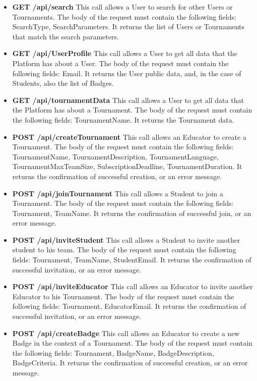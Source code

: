 \begin{itemize}
    \item \textbf{GET /api/search} This call allows a User to search for other Users or Tournaments. The body of the request must contain the following fields: SearchType, SearchParameters. It returns the list of Users or Tournaments that match the search parameters.
    \item \textbf{GET /api/UserProfile} This call allows a User to get all data that the Platform has about a User. The body of the request must contain the following fields: Email. It returns the User public data, and, in the case of Students, also the list of Badges.
    \item \textbf{GET /api/tournamentData} This call allows a User to get all data that the Platform has about a Tournament. The body of the request must contain the following fields: TournamentName. It returns the Tournament data.
    \item \textbf{POST /api/createTournament} This call allows an Educator to create a Tournament. The body of the request must contain the following fields: TournamentName, TournamentDescription, TournamentLanguage, TournamentMaxTeamSize, SubscriptionDeadline, TournamentDuration. It returns the confirmation of successful creation, or an error message.
    \item \textbf{POST /api/joinTournament} This call allows a Student to join a Tournament. The body of the request must contain the following fields: Tournament, TeamName. It returns the confirmation of successful join, or an error message.
    \item \textbf{POST /api/inviteStudent} This call allows a Student to invite another student to his team. The body of the request must contain the following fields: Tournament, TeamName, StudentEmail. It returns the confirmation of successful invitation, or an error message.
    \item \textbf{POST /api/inviteEducator} This call allows an Educator to invite another Educator to his Tournament. The body of the request must contain the following fields: Tournament, EducatorEmail. It returns the confirmation of successful invitation, or an error message.
    \item \textbf{POST /api/createBadge} This call allows an Educator to create a new Badge in the context of a Tournament. The body of the request must contain the following fields: Tournament, BadgeName, BadgeDescription, BadgeCriteria. It returns the confirmation of successful creation, or an error message.

\end{itemize}
